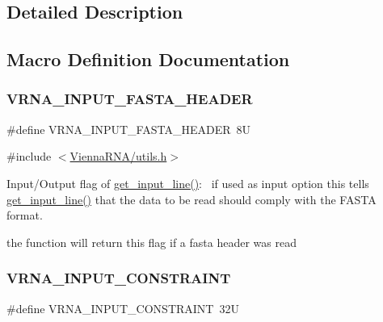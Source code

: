 \subsection{Detailed Description}


\subsection{Macro Definition Documentation}
\mbox{\label{group__utils_ga2f0d8069e93d3ac54d9320d6bdb8e7e7}} 
\subsubsection{\texorpdfstring{V\+R\+N\+A\+\_\+\+I\+N\+P\+U\+T\+\_\+\+F\+A\+S\+T\+A\+\_\+\+H\+E\+A\+D\+ER}{VRNA\_INPUT\_FASTA\_HEADER}}
{\footnotesize\ttfamily \#define V\+R\+N\+A\+\_\+\+I\+N\+P\+U\+T\+\_\+\+F\+A\+S\+T\+A\+\_\+\+H\+E\+A\+D\+ER~8U}



{\ttfamily \#include $<$\hyperlink{utils_8h}{Vienna\+R\+N\+A/utils.\+h}$>$}



Input/\+Output flag of \hyperlink{group__utils_ga8ef1835eb83f542396f59f0b205965e5}{get\+\_\+input\+\_\+line()}\+:~\newline
if used as input option this tells \hyperlink{group__utils_ga8ef1835eb83f542396f59f0b205965e5}{get\+\_\+input\+\_\+line()} that the data to be read should comply with the F\+A\+S\+TA format. 

the function will return this flag if a fasta header was read \mbox{\label{group__utils_gac08a9df45b9721b97a47dbfe7a6e5f85}} 
\subsubsection{\texorpdfstring{V\+R\+N\+A\+\_\+\+I\+N\+P\+U\+T\+\_\+\+C\+O\+N\+S\+T\+R\+A\+I\+NT}{VRNA\_INPUT\_CONSTRAINT}}
{\footnotesize\ttfamily \#define V\+R\+N\+A\+\_\+\+I\+N\+P\+U\+T\+\_\+\+C\+O\+N\+S\+T\+R\+A\+I\+NT~32U}



